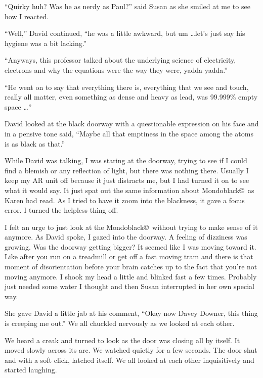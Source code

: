 ``Quirky huh? Was he as nerdy as Paul?'' said Susan as she
smiled at me to see how I reacted.

``Well,'' David continued, ``he was a little awkward, but um
\ldots let's just say his hygiene was a bit lacking.''

``Anyways, this professor talked about the underlying science of
electricity, electrons and why the equations were the way they
were, yadda yadda.''

``He went on to say that everything there is, everything that we
see and touch, really all matter, even something as dense and
heavy as lead, was 99.999\% empty space \ldots''

David looked at the black doorway with a questionable
expression on his face and in a pensive tone said, ``Maybe all
that emptiness in the space among the atoms is as black
as that.''


While David was talking, I was staring at the doorway, trying to
see if I could find a blemish or any reflection of light, but
there was nothing there. Usually I keep my AR unit off because
it just distracts me, but I had turned it on to see what it
would say. It just spat out the same information about
Mondoblack\copyright\ as Karen had read. As I tried to have it
zoom into the blackness, it gave a focus error. I turned the
helpless thing off.


I felt an urge to just look at the Mondoblack\copyright\ without
trying to make sense of it anymore. As David spoke, I gazed into
the doorway. A feeling of dizziness was growing.  Was the
doorway getting bigger? It seemed like I was moving toward it.
Like after you run on a treadmill or get off a fast
moving tram and there is that moment of disorientation before
your brain catches up to the fact that you're not moving
anymore. I shook my head a little and blinked fast a few times.
Probably just needed some water I thought and then Susan
interrupted in her own special way.


She gave David a little jab at his comment, ``Okay now Davey
Downer, this thing is creeping me out.'' We all chuckled
nervously as we looked at each other.

We heard a creak and turned to look as the door was closing all
by itself. It moved slowly across its arc. We watched quietly
for a few seconds. The door shut and with a soft click, latched
itself.  We all looked at each other inquisitively and started
laughing.

